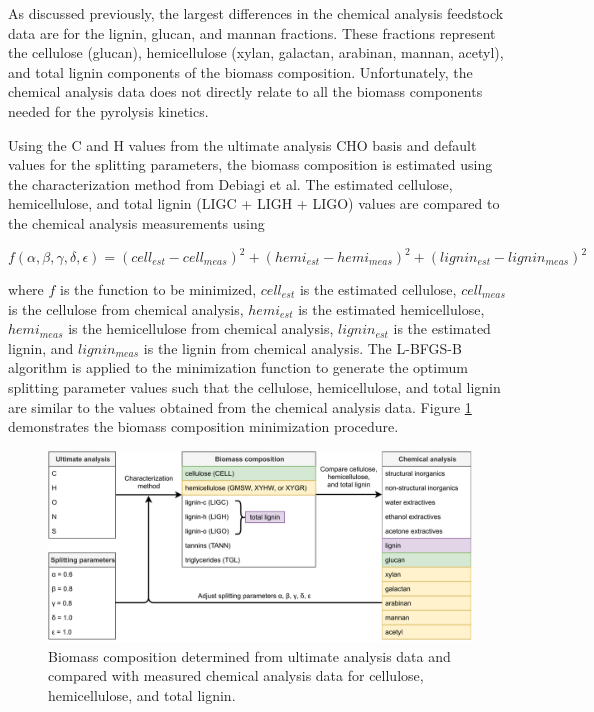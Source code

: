 As discussed previously, the largest differences in the chemical analysis feedstock data are for the lignin, glucan, and mannan fractions. These fractions represent the cellulose (glucan), hemicellulose (xylan, galactan, arabinan, mannan, acetyl), and total lignin components of the biomass composition. Unfortunately, the chemical analysis data does not directly relate to all the biomass components needed for the pyrolysis kinetics.

Using the C and H values from the ultimate analysis CHO basis and default values for the splitting parameters, the biomass composition is estimated using the characterization method from Debiagi et al. The estimated cellulose, hemicellulose, and total lignin (LIGC + LIGH + LIGO) values are compared to the chemical analysis measurements using

\begin{equation}
    f(\alpha, \beta, \gamma, \delta, \epsilon) = (cell_{est} - cell_{meas})^2 + (hemi_{est} - hemi_{meas})^2 + (lignin_{est} - lignin_{meas})^2
\end{equation}

\noindent where $f$ is the function to be minimized, $cell_{est}$ is the estimated cellulose, $cell_{meas}$ is the cellulose from chemical analysis, $hemi_{est}$ is the estimated hemicellulose, $hemi_{meas}$ is the hemicellulose from chemical analysis, $lignin_{est}$ is the estimated lignin, and $lignin_{meas}$ is the lignin from chemical analysis. The L-BFGS-B algorithm is applied to the minimization function to generate the optimum splitting parameter values such that the cellulose, hemicellulose, and total lignin are similar to the values obtained from the chemical analysis data. Figure \ref{fig:biocomp2} demonstrates the biomass composition minimization procedure.

\begin{figure}[H]
    \centering
    \includegraphics[width=\textwidth]{figures/biocomp2.pdf}
    \caption{Biomass composition determined from ultimate analysis data and compared with measured chemical analysis data for cellulose, hemicellulose, and total lignin.}
    \label{fig:biocomp2}
\end{figure}

